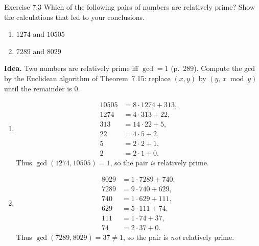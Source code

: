 \begin{question}{Exercise 7.3}
Which of the following pairs of numbers are relatively prime? Show the calculations that led to your conclusions.
\begin{enumerate}[label=\alph*.]
\item $1274$ and $10505$
\item $7289$ and $8029$
\end{enumerate}
\end{question}
\begin{soln}
\textbf{Idea.} Two numbers are relatively prime iff $\gcd=1$ (p.~289). Compute the gcd by the Euclidean algorithm of Theorem~7.15: replace $(x,y)$ by $(y,\,x\bmod y)$ until the remainder is $0$.
\begin{enumerate}[label=\alph*.]
\item
\begin{align*}
10505 &= 8\cdot 1274 + 313,\\
1274 &= 4\cdot 313 + 22,\\
313 &= 14\cdot 22 + 5,\\
22 &= 4\cdot 5 + 2,\\
5 &= 2\cdot 2 + 1,\\
2 &= 2\cdot 1 + 0.
\end{align*}
Thus $\gcd(1274,10505)=1$, so the pair \emph{is} relatively prime.
\item
\begin{align*}
8029 &= 1\cdot 7289 + 740,\\
7289 &= 9\cdot 740 + 629,\\
740 &= 1\cdot 629 + 111,\\
629 &= 5\cdot 111 + 74,\\
111 &= 1\cdot 74 + 37,\\
74 &= 2\cdot 37 + 0.
\end{align*}
Thus $\gcd(7289,8029)=37\neq 1$, so the pair is \emph{not} relatively prime.
\end{enumerate}
\end{soln}

